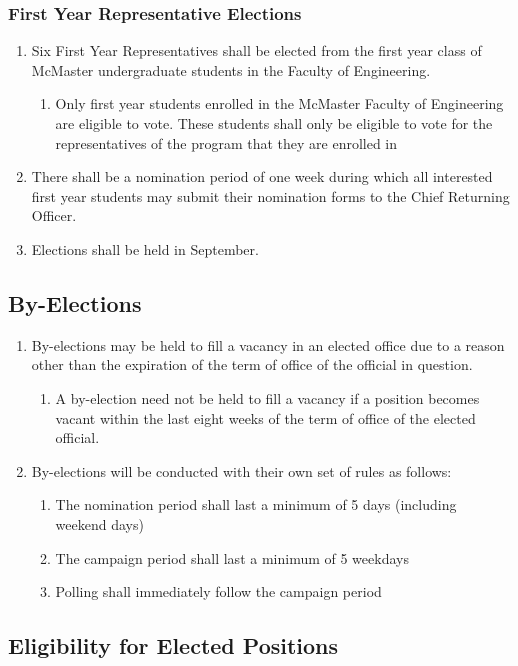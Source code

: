 \hypertarget{first-year-representative-elections}{%
 \subsubsection{First Year Representative
  Elections}
 \label{first-year-representative-elections}}
\begin{enumerate}
 \item
  Six First Year Representatives shall be elected from the first year
  class of McMaster undergraduate students in the Faculty of
  Engineering.

  \begin{enumerate}
   \item
    Only first year students enrolled in the McMaster Faculty of
    Engineering are eligible to vote. These students shall only be
    eligible to vote for the representatives of the program that they
    are enrolled in
  \end{enumerate}
 \item
  There shall be a nomination period of one week during which all
  interested first year students may submit their nomination forms to
  the Chief Returning Officer.
 \item
  Elections shall be held in September.
\end{enumerate}
\hypertarget{by-elections}{%
 \subsection{By-Elections}
 \label{by-elections}}

\begin{enumerate}
 \item
  By-elections may be held to fill a vacancy in an elected office due to
  a reason other than the expiration of the term of office of the
  official in question.

  \begin{enumerate}
   \item
    A by-election need not be held to fill a vacancy if a position
    becomes vacant within the last eight weeks of the term of office of
    the elected official.
  \end{enumerate}
 \item
  By-elections will be conducted with their own set of rules as follows:

  \begin{enumerate}
   \item
    The nomination period shall last a minimum of 5 days (including
    weekend days)
   \item
    The campaign period shall last a minimum of 5 weekdays
   \item
    Polling shall immediately follow the campaign period
  \end{enumerate}
\end{enumerate}
\hypertarget{eligibility-for-elected-positions}{%
 \subsection{Eligibility for Elected
  Positions}
 \label{eligibility-for-elected-positions}}

